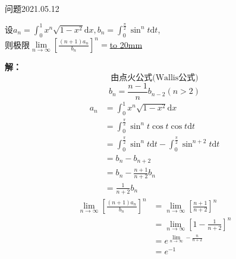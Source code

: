 \begin{mybox}{问题2021.05.12}
	
	\qquad 设$a_n=\int_{0}^{1} x^n \sqrt{1-x^2}\mathrm{d}x,b_n=\int_{0}^{\frac{\pi}{2}}\sin^n t\mathrm{d}t$,\\则极限$\lim\limits_{n\to \infty}\left[\frac{(n+1)a_n}{b_n} \right]^n=$\underline{\hbox to 20mm{}}
\end{mybox}
\noindent
\textbf{解：}
$$\text{由点火公式(Wallis公式)}$$
$$b_n=\frac{n-1}{n}b_{n-2}(n>2)$$
\begin{align*}
	a_n&=\int_{0}^{1} x^n \sqrt{1-x^2}\mathrm{d}x\\
	   &=\int_{0}^{\frac{\pi}{2}}\sin^n t \cos t \cos t \mathrm{d}t\\ 
	   &=\int_{0}^{\frac{\pi}{2}}\sin^n t \mathrm{d}t-\int_{0}^{\frac{\pi}{2}}\sin^{n+2} t\mathrm{d}t\\
	   &=b_n-b_{n+2}\\
	   &=b_n-\frac{n+1}{n+2}b_n\\
	   &=\frac{1}{n+2}b_n
\end{align*}
\begin{align*}
	\lim\limits_{n\to \infty}\left[\frac{(n+1)a_n}{b_n} \right]^n&=\lim \limits_{n\to \infty} \left[\frac{n+1}{n+2}\right]^n\\
	&=\lim\limits_{n\to\infty} \left[1-\frac{1}{n+2}\right]^n\\
	&=e^{\lim\limits_{n\to\infty} -\frac{n}{n+2}}\\
	&=e^{-1}
\end{align*}